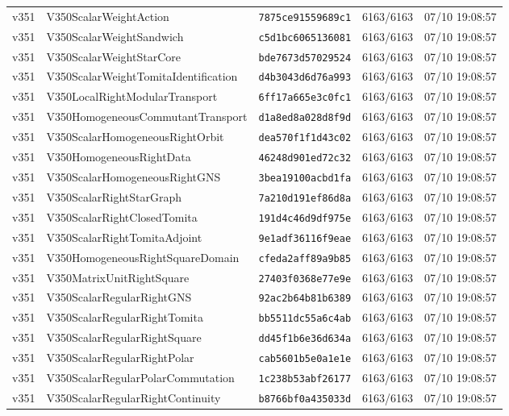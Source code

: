 \documentclass[11pt]{article}
\theoremstyle{definition}\newtheorem{deriv}{Derivation}
\begin{document}
{\begin{longtable}{@{}lllll@{}}
v351 & V350ScalarWeightAction & \texttt{7875ce91559689c1} & 6163/6163 & 07/10 19:08:57 \\
v351 & V350ScalarWeightSandwich & \texttt{c5d1bc6065136081} & 6163/6163 & 07/10 19:08:57 \\
v351 & V350ScalarWeightStarCore & \texttt{bde7673d57029524} & 6163/6163 & 07/10 19:08:57 \\
v351 & V350ScalarWeightTomitaIdentification & \texttt{d4b3043d6d76a993} & 6163/6163 & 07/10 19:08:57 \\
v351 & V350LocalRightModularTransport & \texttt{6ff17a665e3c0fc1} & 6163/6163 & 07/10 19:08:57 \\
v351 & V350HomogeneousCommutantTransport & \texttt{d1a8ed8a028d8f9d} & 6163/6163 & 07/10 19:08:57 \\
v351 & V350ScalarHomogeneousRightOrbit & \texttt{dea570f1f1d43c02} & 6163/6163 & 07/10 19:08:57 \\
v351 & V350HomogeneousRightData & \texttt{46248d901ed72c32} & 6163/6163 & 07/10 19:08:57 \\
v351 & V350ScalarHomogeneousRightGNS & \texttt{3bea19100acbd1fa} & 6163/6163 & 07/10 19:08:57 \\
v351 & V350ScalarRightStarGraph & \texttt{7a210d191ef86d8a} & 6163/6163 & 07/10 19:08:57 \\
v351 & V350ScalarRightClosedTomita & \texttt{191d4c46d9df975e} & 6163/6163 & 07/10 19:08:57 \\
v351 & V350ScalarRightTomitaAdjoint & \texttt{9e1adf36116f9eae} & 6163/6163 & 07/10 19:08:57 \\
v351 & V350HomogeneousRightSquareDomain & \texttt{cfeda2aff89a9b85} & 6163/6163 & 07/10 19:08:57 \\
v351 & V350MatrixUnitRightSquare & \texttt{27403f0368e77e9e} & 6163/6163 & 07/10 19:08:57 \\
v351 & V350ScalarRegularRightGNS & \texttt{92ac2b64b81b6389} & 6163/6163 & 07/10 19:08:57 \\
v351 & V350ScalarRegularRightTomita & \texttt{bb5511dc55a6c4ab} & 6163/6163 & 07/10 19:08:57 \\
v351 & V350ScalarRegularRightSquare & \texttt{dd45f1b6e36d634a} & 6163/6163 & 07/10 19:08:57 \\
v351 & V350ScalarRegularRightPolar & \texttt{cab5601b5e0a1e1e} & 6163/6163 & 07/10 19:08:57 \\
v351 & V350ScalarRegularPolarCommutation & \texttt{1c238b53abf26177} & 6163/6163 & 07/10 19:08:57 \\
v351 & V350ScalarRegularRightContinuity & \texttt{b8766bf0a435033d} & 6163/6163 & 07/10 19:08:57 \\

\end{longtable}}
\end{document}
